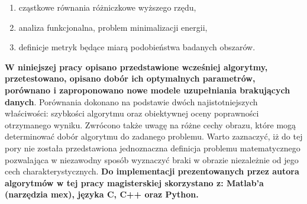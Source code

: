 \documentclass[12pt, twoside, openany]{report}
\theoremstyle{definition}
\begin{document}
\begin{enumerate}
\item
cząstkowe równania różniczkowe wyższego rzędu,
\item
analiza funkcjonalna, problem minimalizacji energii,
\item
definicje metryk będące miarą podobieństwa badanych obszarów.
\end{enumerate}
\textbf{W niniejszej pracy opisano przedstawione wcześniej algorytmy, przetestowano, opisano dobór ich optymalnych parametrów, porównano i zaproponowano nowe modele uzupełniania brakujących danych}.
Porównania dokonano na podstawie dwóch najistotniejszych właściwości: szybkości algorytmu oraz obiektywnej oceny poprawności otrzymanego wyniku. Zwrócono także uwagę na różne cechy obrazu, które mogą determinować dobór algorytmu do zadanego problemu. Warto zaznaczyć, iż do tej pory nie została przedstawiona jednoznaczna definicja problemu matematycznego pozwalająca w niezawodny sposób wyznaczyć braki w obrazie niezależnie od jego cech charakterystycznych.
\textbf{Do implementacji prezentowanych przez autora algorytmów w tej pracy magisterskiej skorzystano z: Matlab'a (narzędzia mex), języka C, C++ oraz Python.}
\end{document}
